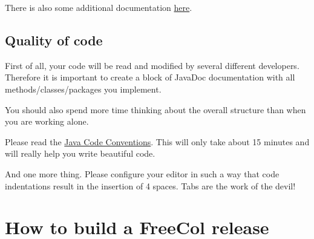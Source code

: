 \documentclass[12pt]{book}
\begin{document}
There is also some additional documentation 
\href{http://www.freecol.org/index.php?section=3}{here}.


\hypertarget{Quality of code}{\section{Quality of code}}

First of all, your code will be read and modified by several
different developers. Therefore it is important to create a
block of JavaDoc documentation with all methods/classes/packages
you implement.

You should also spend more time thinking about the overall
structure than when you are working alone.

Please read the \href{http://java.sun.com/docs/codeconv/}{Java Code
  Conventions}. This will only take about 15 minutes and will really
help you write beautiful code.

And one more thing. Please configure your editor in such a way
that code indentations result in the insertion of 4 spaces. Tabs
are the work of the devil!




\hypertarget{How to build a FreeCol release}{\chapter{How to build a FreeCol release}}
\end{document}
